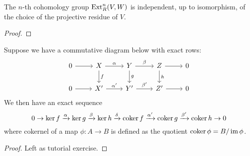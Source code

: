 \begin{thm}
    The $n$-th cohomology group $\operatorname{Ext}^n_R(V,W)$ is independent, up to isomorphism, of the choice of the projective residue of $V$.
\end{thm}
\begin{proof}
\end{proof}

\begin{thm} 
    Suppose we have a commutative diagram below with exact rows:
    \[\begin{tikzcd} [sep = small]
	0 && X && Y && Z && 0 \\
	\\
	0 && {X'} && {Y'} && {Z'} && 0
	\arrow[from=1-1, to=1-3]
	\arrow["\alpha", from=1-3, to=1-5]
	\arrow["f", from=1-3, to=3-3]
	\arrow["\beta", from=1-5, to=1-7]
	\arrow["g", from=1-5, to=3-5]
	\arrow[from=1-7, to=1-9]
	\arrow["h", from=1-7, to=3-7]
	\arrow[from=3-1, to=3-3]
	\arrow["{\alpha'}", from=3-3, to=3-5]
	\arrow["{\beta'}", from=3-5, to=3-7]
	\arrow[from=3-7, to=3-9]
    \end{tikzcd}\]
    We then have an exact sequence
    \[0 \to \ker f \xrightarrow{\alpha} \ker g \xrightarrow{\beta} \ker h \xrightarrow{\delta} \operatorname{coker} f \xrightarrow{\alpha'} \operatorname{coker} g \xrightarrow{\beta'} \operatorname{coker} h \to 0\]
    where cokernel of a map $\phi:A\to B$ is defined as the quotient $\operatorname{coker} \phi = B/\operatorname{im} \phi$.
\end{thm}
\begin{proof}
    Left as tutorial exercise.
\end{proof}

